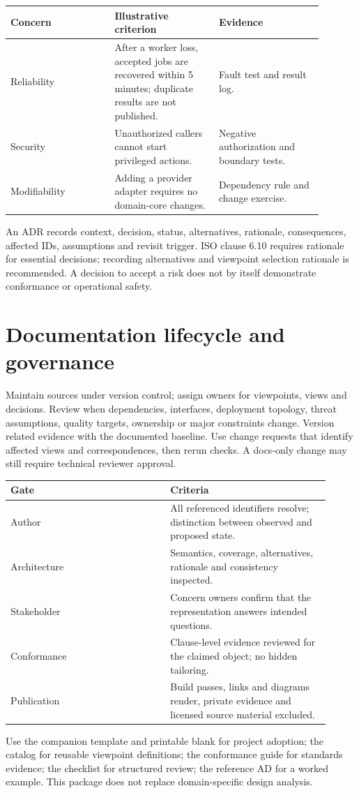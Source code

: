 \documentclass[11pt,letterpaper]{article}
\newcommand{\docsection}[1]{\Needspace{5\baselineskip}\section{#1}}
\begin{document}
\begin{longtable}{@{}>{\RaggedRight\arraybackslash}p{0.297\linewidth}>{\RaggedRight\arraybackslash}p{0.297\linewidth}>{\RaggedRight\arraybackslash}p{0.297\linewidth}@{}}
\toprule
\textbf{Concern} & \textbf{Illustrative criterion} & \textbf{Evidence}\\\midrule
\endhead
Reliability & After a worker loss, accepted jobs are recovered within 5 minutes; duplicate results are not published. & Fault test and result log.\\
Security & Unauthorized callers cannot start privileged actions. & Negative authorization and boundary tests.\\
Modifiability & Adding a provider adapter requires no domain-core changes. & Dependency rule and change exercise.\\
\bottomrule
\end{longtable}
An ADR records context, decision, status, alternatives, rationale, consequences, affected IDs, assumptions and revisit trigger. ISO clause 6.10 requires rationale for essential decisions; recording alternatives and viewpoint selection rationale is recommended. A decision to accept a risk does not by itself demonstrate conformance or operational safety.

\docsection{Documentation lifecycle and governance}
Maintain sources under version control; assign owners for viewpoints, views and decisions. Review when dependencies, interfaces, deployment topology, threat assumptions, quality targets, ownership or major constraints change. Version related evidence with the documented baseline. Use change requests that identify affected views and correspondences, then rerun checks. A docs-only change may still require technical reviewer approval.

\begin{longtable}{@{}>{\RaggedRight\arraybackslash}p{0.457\linewidth}>{\RaggedRight\arraybackslash}p{0.457\linewidth}@{}}
\toprule
\textbf{Gate} & \textbf{Criteria}\\\midrule
\endhead
Author & All referenced identifiers resolve; distinction between observed and proposed state.\\
Architecture & Semantics, coverage, alternatives, rationale and consistency inspected.\\
Stakeholder & Concern owners confirm that the representation answers intended questions.\\
Conformance & Clause-level evidence reviewed for the claimed object; no hidden tailoring.\\
Publication & Build passes, links and diagrams render, private evidence and licensed source material excluded.\\
\bottomrule
\end{longtable}
Use the companion template and printable blank for project adoption; the catalog for reusable viewpoint definitions; the conformance guide for standards evidence; the checklist for structured review; the reference AD for a worked example. This package does not replace domain-specific design analysis.
\end{document}
